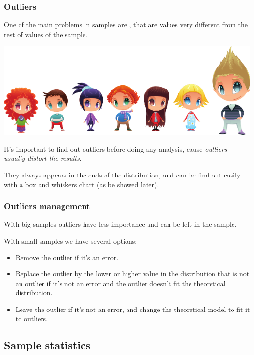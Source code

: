 \begin{frame}
\frametitle{Outliers}
One of the main problems in samples are , that are values very different from the rest of
values of the sample.
\begin{center}
\includegraphics[scale=0.5]{img/descriptive/outlier.png}
\end{center}

It's important to find out outliers before doing any analysis, cause \alert{\emph{outliers usually distort the
results}}.

They always appears in the ends of the distribution, and can be find out easily with a box and whiskers chart (as 
be showed later).
\end{frame}


\begin{frame}
\frametitle{Outliers management}
With big samples outliers have less importance and can be left in the sample.

With small samples we have several options:

\begin{itemize}
\item Remove the outlier if it's an error. 
\item Replace the outlier by the lower or higher value in the distribution that is not an outlier if it's not an error
and the outlier doesn't fit the theoretical distribution. 
\item Leave the outlier if it's not an error, and change the theoretical model to fit it to outliers.  
\end{itemize}
\end{frame}
 


\subsection{Sample statistics}

